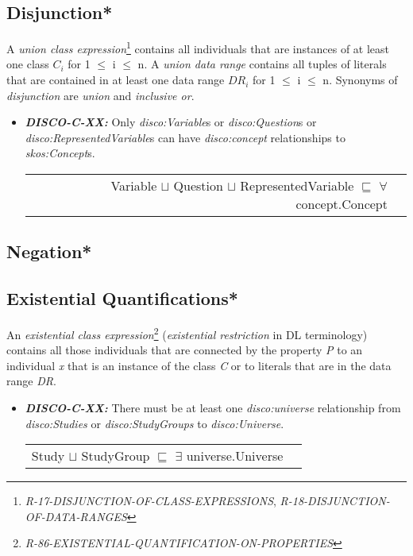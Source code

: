 \documentclass{llncs}
\newenvironment{DL}{
  \vspace{0cm}
  \begin{tabular}{r l}

}{
  \end{tabular}
}
\begin{document}
\subsection{Disjunction*}

A \emph{union class expression}\footnote{{\em R-17-DISJUNCTION-OF-CLASS-EXPRESSIONS}, {\em R-18-DISJUNCTION-OF-DATA-RANGES}} contains all individuals that are instances of at least one class $C_{i}$ for 1 $\leq$ i $\leq$ n. 
A \emph{union data range} contains all tuples of literals that are contained in at least one data range $DR_{i}$ for 1 $\leq$ i $\leq$ n.
Synonyms of {\em disjunction} are {\em union} and {\em inclusive or}.

\begin{itemize}
	\item \textbf{{\em DISCO-C-XX:}} 
Only {\em disco:Variable}s or {\em disco:Question}s or {\em disco:RepresentedVariable}s can have {\em disco:concept} relationships to {\em skos:Concept}s.

\begin{DL}
Variable $\sqcup$ Question $\sqcup$ RepresentedVariable $\sqsubseteq$ $\forall$ concept.Concept \\
\end{DL}
\end{itemize}

\subsection{Negation*}

\subsection{Existential Quantifications*}

An \emph{existential class expression}\footnote{{\em R-86-EXISTENTIAL-QUANTIFICATION-ON-PROPERTIES}} ({\em existential restriction} in DL terminology) contains all those individuals that are connected by the property \emph{P} to an individual \emph{x} that is an instance of the class \emph{C} or to literals that are in the data range \emph{DR}.

\begin{itemize}
	\item \textbf{{\em DISCO-C-XX:}} 
There must be at least one {\em disco:universe} relationship from {\em disco:Studies} or {\em disco:StudyGroups} to {\em disco:Universe}.

\begin{DL}
Study $\sqcup$ StudyGroup $\sqsubseteq$ $\exists$ universe.Universe \\
\end{DL}
\end{itemize}
\end{document}
